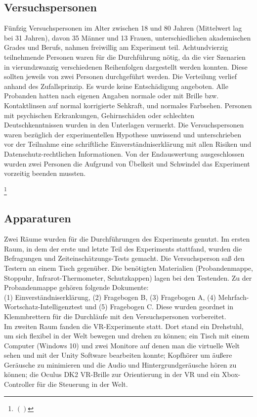 \documentclass{Paper}
\begin{document}
	\subsection{Versuchspersonen}
		Fünfzig Versuchspersonen im Alter zwischen 18 und 80 Jahren (Mittelwert lag bei 31 Jahren),
		davon 35 Männer und 13 Frauen, unterschiedlichen akademischen Grades und Berufs, nahmen
		freiwillig am Experiment teil. Achtundvierzig teilnehmende Personen waren für die
		Durchführung nötig, da die vier Szenarien in vierundzwanzig verschiedenen Reihenfolgen
		dargestellt werden konnten. Diese sollten jeweils von zwei Personen durchgeführt werden. Die
		Verteilung verlief anhand des Zufallsprinzip. Es wurde keine Entschädigung angeboten. Alle
		Probanden hatten nach eigenen Angaben normale oder mit Brille bzw. Kontaktlinsen auf
		normal korrigierte Sehkraft, und normales Farbsehen. Personen mit
		psychischen Erkrankungen, Gehirnschäden oder schlechten Deutschkenntnissen wurden in den Unterlagen vermerkt. Die Versuchspersonen waren bezüglich der experimentellen Hypothese unwissend
		und unterschrieben vor der Teilnahme eine schriftliche Einverständniserklärung mit allen
		Risiken und Datenschutz-rechtlichen Informationen.
		Von der Endauswertung ausgeschlossen wurden zwei Personen die Aufgrund von Übelkeit und
		Schwindel das Experiment vorzeitig beenden mussten.
		\par
		
		\footnote{$()$}
		
	\subsection{Apparaturen}
		Zwei Räume wurden für die Durchführungen des Experiments genutzt. Im ersten Raum, in dem der erste und letzte Teil des Experiments stattfand, wurden die Befragungen und Zeiteinschätzungs-Tests gemacht. 
	Die Versuchsperson saß den Testern an einem Tisch gegenüber. Die benötigten Materialien (Probandenmappe, Stoppuhr, Infrarot-Thermometer, Schutzkappen) lagen bei den Testenden. Zu der Probandenmappe gehören folgende Dokumente:\\		
	 (1) Einverständniserklärung, (2) \glqq Fragebogen B\grqq, (3) \glqq Fragebogen A\grqq, (4)
		Mehrfach-Wortschatz-Intelligenztest und (5) \glqq Fragebogen C\grqq.
		Diese wurden geordnet in Klemmbrettern für die Durchläufe mit den Versuchspersonen
		vorbereitet. \\
		Im zweiten Raum fanden die VR-Experimente statt. Dort stand ein Drehstuhl, um sich flexibel in der
		Welt bewegen und drehen zu können; ein Tisch mit einem Computer (Windows 10) und zwei Monitore auf denen man
		die virtuelle Welt sehen und mit der Unity Software bearbeiten konnte; Kopfhörer um äußere
		Geräusche zu minimieren und die Audio und Hintergrundgeräusche hören zu können; die Oculus DK2 VR-Brille
		zur Orientierung in der VR und ein Xbox-Controller für die Steuerung in der Welt.
\end{document}
